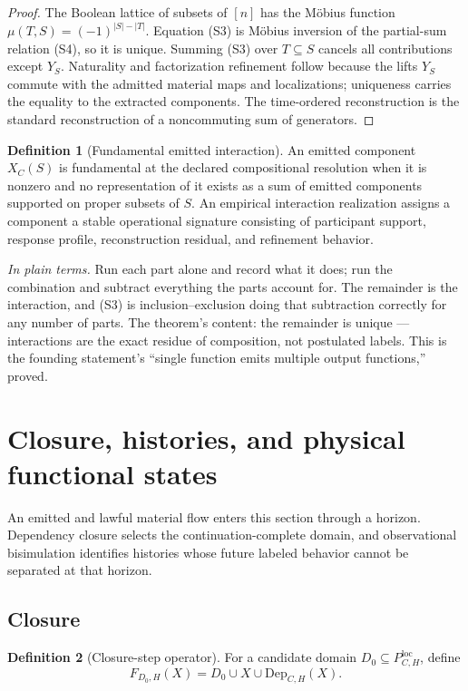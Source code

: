 \documentclass[11pt]{article}
\theoremstyle{definition}
\newtheorem{definition}{Definition}
\newcommand{\plainterms}{\emph{In plain terms.}}
\begin{document}
\begin{proof}
The Boolean lattice of subsets of $[n]$ has the M\"obius function $\mu(T, S) = (-1)^{|S|-|T|}$. Equation (S3) is M\"obius inversion of the partial-sum relation (S4), so it is unique. Summing (S3) over $T \subseteq S$ cancels all contributions except $Y_S$. Naturality and factorization refinement follow because the lifts $Y_S$ commute with the admitted material maps and localizations; uniqueness carries the equality to the extracted components. The time-ordered reconstruction is the standard reconstruction of a noncommuting sum of generators.
\end{proof}

\begin{definition}[Fundamental emitted interaction]
An emitted component $X_C(S)$ is fundamental at the declared compositional resolution when it is nonzero and no representation of it exists as a sum of emitted components supported on proper subsets of $S$. An empirical interaction realization assigns a component a stable operational signature consisting of participant support, response profile, reconstruction residual, and refinement behavior.
\end{definition}

\noindent\plainterms{} Run each part alone and record what it does; run the combination and subtract everything the parts account for. The remainder is the interaction, and (S3) is inclusion--exclusion doing that subtraction correctly for any number of parts. The theorem's content: the remainder is unique --- interactions are the exact residue of composition, not postulated labels. This is the founding statement's ``single function emits multiple output functions,'' proved.

\section{Closure, histories, and physical functional states}

An emitted and lawful material flow enters this section through a horizon. Dependency closure selects the continuation-complete domain, and observational bisimulation identifies histories whose future labeled behavior cannot be separated at that horizon.

\subsection{Closure}

\begin{definition}[Closure-step operator]
For a candidate domain $D_0 \subseteq P^{\mathrm{loc}}_{C,H}$, define
\begin{equation}
F_{D_0,H}(X) = D_0 \cup X \cup \mathrm{Dep}_{C,H}(X). \tag{S5}
\end{equation}
\end{definition}
\end{document}
